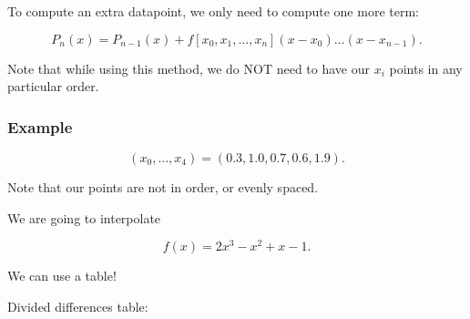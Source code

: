 \documentclass[12pt]{article}
\begin{document}
To compute an extra datapoint, we only need to compute one more term:

\[
  P_n(x) = P_{n-1}(x) + f[x_0, x_1, \dots, x_n](x-x_0) \dots (x-x_{n-1})
.\]

Note that while using this method, we do NOT need to have our $x_i$ points in
any particular order.

\subsubsection{Example}

\[
  (x_0, \dots, x_4) = (0.3, 1.0, 0.7, 0.6, 1.9)
.\]

Note that our points are not in order, or evenly spaced.

We are going to interpolate 

\[
  f(x) = 2x^3 - x^2 +x - 1
.\]

We can use a table!

Divided differences table:

\end{document}

